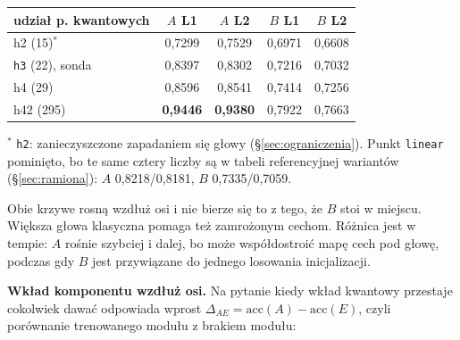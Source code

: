 \documentclass[11pt, a4paper]{article}
\begin{document}
\begin{table}[H]
\centering
\renewcommand{\arraystretch}{1.3}
\begin{tabular}{lcccc}
\toprule
\textbf{udział p. kwantowych} & $A$ \textbf{L1} & $A$ \textbf{L2} & $B$ \textbf{L1} & $B$ \textbf{L2} \\
\midrule
h2 (15)$^{*}$ & 0,7299 & 0,7529 & 0,6971 & 0,6608 \\
\texttt{h3} (22), sonda & 0,8397 & 0,8302 & 0,7216 & 0,7032 \\
h4 (29) & 0,8596 & 0,8541 & 0,7414 & 0,7256 \\
h42 (295) & \textbf{0,9446} & \textbf{0,9380} & 0,7922 & 0,7663 \\
\bottomrule
\end{tabular}
\begin{minipage}{\textwidth}
\footnotesize $^{*}$ \texttt{h2}: zanieczyszczone zapadaniem się głowy (\S\ref{sec:ograniczenia}). Punkt \texttt{linear} pominięto, bo te same cztery liczby są w tabeli referencyjnej wariantów (\S\ref{sec:ramiona}): $A$ 0,8218/0,8181, $B$ 0,7335/0,7059.
\end{minipage}
\end{table}

Obie krzywe rosną wzdłuż osi i nie bierze się to z tego, że $B$ stoi w miejscu. Większa głowa klasyczna pomaga też zamrożonym cechom. Różnica jest w tempie: $A$ rośnie szybciej i dalej, bo może współdostroić mapę cech pod głowę, podczas gdy $B$ jest przywiązane do jednego losowania inicjalizacji.

\textbf{Wkład komponentu wzdłuż osi.} Na pytanie kiedy wkład kwantowy przestaje cokolwiek dawać odpowiada wprost $\Delta_{AE} = \text{acc}(A) - \text{acc}(E)$, czyli porównanie trenowanego modułu z brakiem modułu:

\begin{table}[H]
\centering
\footnotesize
\renewcommand{\arraystretch}{1.3}
\setlength{\tabcolsep}{4pt}
\end{table}
\end{document}
